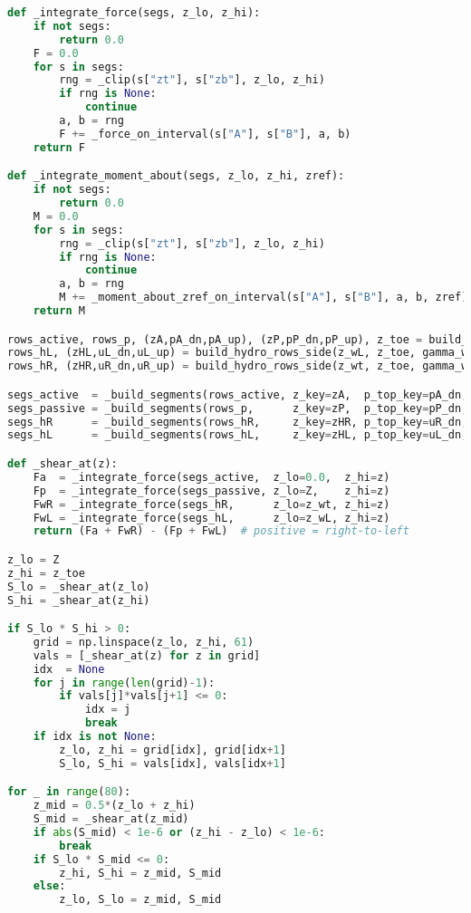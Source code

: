 \begin{lstlisting}[language=Python]
def _integrate_force(segs, z_lo, z_hi):
    if not segs:
        return 0.0
    F = 0.0
    for s in segs:
        rng = _clip(s["zt"], s["zb"], z_lo, z_hi)
        if rng is None:
            continue
        a, b = rng
        F += _force_on_interval(s["A"], s["B"], a, b)
    return F

def _integrate_moment_about(segs, z_lo, z_hi, zref):
    if not segs:
        return 0.0
    M = 0.0
    for s in segs:
        rng = _clip(s["zt"], s["zb"], z_lo, z_hi)
        if rng is None:
            continue
        a, b = rng
        M += _moment_about_zref_on_interval(s["A"], s["B"], a, b, zref)
    return M

rows_active, rows_p, (zA,pA_dn,pA_up), (zP,pP_dn,pP_up), z_toe = build_rows_for_d(d_star)
rows_hL, (zHL,uL_dn,uL_up) = build_hydro_rows_side(z_wL, z_toe, gamma_w)
rows_hR, (zHR,uR_dn,uR_up) = build_hydro_rows_side(z_wt, z_toe, gamma_w)

segs_active  = _build_segments(rows_active, z_key=zA,  p_top_key=pA_dn, p_bot_key=pA_up, factor=gamma_G_unfav)  # 0 → z
segs_passive = _build_segments(rows_p,      z_key=zP,  p_top_key=pP_dn, p_bot_key=pP_up, factor=gamma_G_unfav)  # Z → z
segs_hR      = _build_segments(rows_hR,     z_key=zHR, p_top_key=uR_dn, p_bot_key=uR_up, factor=gamma_G_unfav)  # z_wt → z
segs_hL      = _build_segments(rows_hL,     z_key=zHL, p_top_key=uL_dn, p_bot_key=uL_up, factor=gamma_G_unfav)  # z_wL → z

def _shear_at(z):
    Fa  = _integrate_force(segs_active,  z_lo=0.0,  z_hi=z)
    Fp  = _integrate_force(segs_passive, z_lo=Z,    z_hi=z)
    FwR = _integrate_force(segs_hR,      z_lo=z_wt, z_hi=z)
    FwL = _integrate_force(segs_hL,      z_lo=z_wL, z_hi=z)
    return (Fa + FwR) - (Fp + FwL)  # positive = right-to-left

z_lo = Z
z_hi = z_toe
S_lo = _shear_at(z_lo)
S_hi = _shear_at(z_hi)

if S_lo * S_hi > 0:
    grid = np.linspace(z_lo, z_hi, 61)
    vals = [_shear_at(z) for z in grid]
    idx  = None
    for j in range(len(grid)-1):
        if vals[j]*vals[j+1] <= 0:
            idx = j
            break
    if idx is not None:
        z_lo, z_hi = grid[idx], grid[idx+1]
        S_lo, S_hi = vals[idx], vals[idx+1]

for _ in range(80):
    z_mid = 0.5*(z_lo + z_hi)
    S_mid = _shear_at(z_mid)
    if abs(S_mid) < 1e-6 or (z_hi - z_lo) < 1e-6:
        break
    if S_lo * S_mid <= 0:
        z_hi, S_hi = z_mid, S_mid
    else:
        z_lo, S_lo = z_mid, S_mid


\end{lstlisting}
